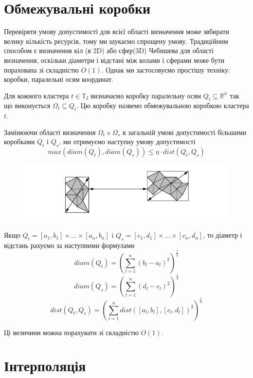 \documentclass[12pt]{report}
\begin{document}
	\section{Обмежувальні коробки}
	\hspace{0.8cm} Перевіряти умову допустимості для всієї області визначення може звбирати велику кількість ресурсів, тому ми шукаємо спрощену умову. Традиційним способом є визначення кіл  (в 2D) або сфер(3D) Чебишева для області визначення, оскільки діаметри і відстані між колами і сферами може бути порахована зі складністю $O(1)$. Однак ми застосовуємо простішу техніку: коробки, паралельні осям координат.
	\par Для кожного кластера $t\in \mathbb{T}_I$ визначаємо коробку паралельну осям $Q_t\subseteq\mathbb{R}^n$ так що виконується $\Omega_t\subseteq Q_t$. Цю коробку назвемо обмежувальною коробкою кластера $t$. 
	\par Замінюючи області визначення $\Omega_t$ s $\Omega_s$ в загальній умові допустимості більшими коробками $Q_t$ і $Q_s$, ми отримуємо наступну умову допустимості
	$$max(diam(Q_{t}),diam(Q_{s}))\le \eta\cdot dist(Q_{t},Q_{s})$$
	\begin{figure}[bh]{
			\includegraphics{2_0}
		}
	\end{figure}	
	\par Якщо $Q_t=[a_1,b_1]\times...\times[a_n,b_n]$ i $Q_s=[c_1,d_1]\times...\times[c_n,d_n]$, то діаметр і відстань рахуємо за наступними формулами
	$$diam(Q_t)=\left(\sum_{l=1}^{n}(b_l-a_l)^2\right)^\frac{1}{2}$$
	$$diam(Q_s)=\left(\sum_{l=1}^{n}(d_l-c_l)^2\right)^\frac{1}{2}$$
	$$dist(Q_t,Q_s)=\left(\sum_{l=1}^{n}dist([a_l,b_l],[c_l,d_l])^2\right)^\frac{1}{2}$$
	\par Ці величини можна порахувати зі складністю $O(1)$.
	\section{Інтерполяція}
\end{document}
